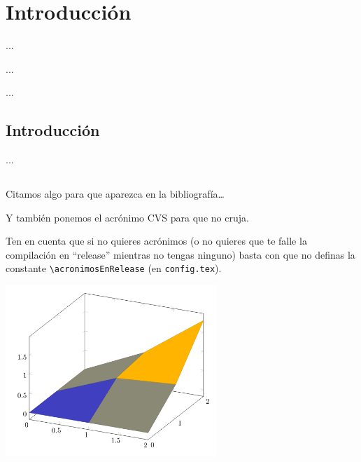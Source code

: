 %
%

\chapter{Introducci\'on}

\begin{FraseCelebre}
\begin{Frase}
...
\end{Frase}
\begin{Fuente}
...
\end{Fuente}
\end{FraseCelebre}

\begin{resumen}
...
\end{resumen}


\section{Introducci\'on}
\label{cap1:sec:introduccion}

...

\section*{\NotasBibliograficas}
\TocNotasBibliograficas

Citamos algo para que aparezca en la bibliograf\'ia\ldots
\citep{ldesc2e}

\medskip

Y tambi\'en ponemos el acr\'onimo \ac{CVS} para que no cruja.

Ten en cuenta que si no quieres acr\'onimos (o no quieres que te falle la compilaci\'on en ``release'' mientras no tengas ninguno) basta con que no definas la constante \verb+\acronimosEnRelease+ (en \texttt{config.tex}).

\begin{chart}
    \centering
    \includegraphics[width=8cm]{Imagenes/Pgfplot3d3}
    \label{cha:chart1}
    \end{chart}
    

